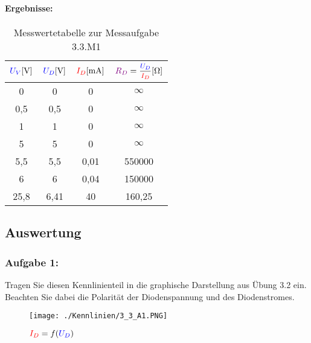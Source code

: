 \documentclass[a4paper,titlepage,parskip]{scrreprt}
\newcommand{\spannung}[1]{\textcolor{blue}{#1}}
\newcommand{\strom}[1]{\textcolor{red}{#1}}
\newcommand{\widerstand}[1]{\textcolor{violet}{#1}}
\begin{document}
              \paragraph{Ergebnisse:}
                  \begin{center}
                      \begin{table}[!hbtp]
                          \caption{Messwertetabelle zur Messaufgabe 3.3.M1}
                          \label{tbl:messergebnisse3.3}
                          \renewcommand{\arraystretch}{1.3}
                          \begin{center}

                              \begin{tabular}{cccc}
                                  $\spannung{U_V} [\si{\volt}]$ &
                                  $\spannung{U_D}[\si{\volt}]$ &
                                  $\strom{I_D} [\si{\milli\ampere}]$ &
                                  $\widerstand{R_D} = \mfrac{\spannung{U_D}}{\strom{I_D}} [\si{\ohm}]$ \\ \hline

                                  0 & 0 & 0 & $\infty$\\
                                  0,5 & 0,5 & 0 & $\infty$\\
                                  1 & 1 & 0 & $\infty$\\
                                  5 & 5 & 0 & $\infty$\\
                                  5,5 & 5,5 & 0,01 & 550000\\
                                  6 & 6 & 0,04 & 150000\\
                                  25,8 & 6,41 & 40 & 160,25\\
                              \end{tabular}
                          \end{center}
                      \end{table}
                  \end{center}

         \subsection{Auswertung}
            \subsubsection{Aufgabe 1:} Tragen Sie diesen Kennlinienteil in die graphische Darstellung aus Übung 3.2 ein. Beachten Sie dabei die Polarität der Diodenspannung und des Diodenstromes.
            	\begin{figure}[!htbp]
                	\begin{center}
                    	\texttt{[image: ./Kennlinien/3\_3\_A1.PNG]}

                        	\caption{$\strom{I_D} = f(\spannung{U_D})$}

                  	\end{center}
              	\end{figure}
\end{document}
